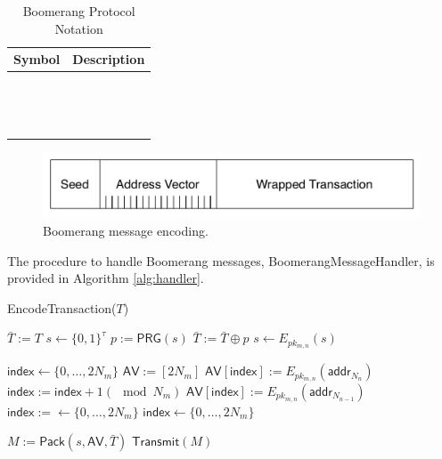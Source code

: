\begin{table}[ht!]
\begin{center}
\caption{Boomerang Protocol Notation}
	\begin{tabular}{|l|l|}\hline
	\textbf{Symbol} & \textbf{Description} \\ \hline
	~ & ~ \\
	~ & ~ \\
	~ & ~ \\ \hline
	\end{tabular}
\end{center}
\end{table}

\begin{figure}[ht!]
\begin{center}
\includegraphics[scale=0.4]{./images/boomerang_message.pdf}
\caption{Boomerang message encoding.}
\label{fig:boomerang_message}
\end{center}
\end{figure}

The procedure to handle Boomerang messages, {\sf BoomerangMessageHandler}, is provided in Algorithm \ref{alg:handler}. 

\begin{algorithm*}[t!]
\caption{{\sf EncodeTransaction}($T$)}
\label{alg:encode}
\begin{algorithmic}[1]

	\State $\bar{T} := T$
	\State $s \gets \{0,1\}^{\tau}$
		\State $p := \mathsf{PRG}(s)$
		\State $\bar{T} := \bar{T} \oplus p$
		\State $s \gets E_{pk_{m,n}}(s)$
	\EndFor

	\State $\mathsf{index} \gets \{0,\dots,2N_m\}$ %
	\State $\mathsf{AV} := [2N_m]$ %
		\State $\mathsf{AV}[\mathsf{index}] := E_{pk_{m,n}}(\mathsf{addr}_{N_n})$
		\State $\mathsf{index} := \mathsf{index} + 1 (\mod N_m)$
		\State $\mathsf{AV}[\mathsf{index}] := E_{pk_{m,n}}(\mathsf{addr}_{N_{n-1}})$
		\State $\mathsf{index} := \gets \{0,\dots,2N_m\}$
			\State $\mathsf{index} \gets \{0,\dots,2N_m\}$
		\EndWhile
	\EndFor

	\State $M := \mathsf{Pack}(s, \mathsf{AV}, \bar{T})$
	\State $\mathsf{Transmit}(M)$
\EndFor

\end{algorithmic}
\end{algorithm*}

